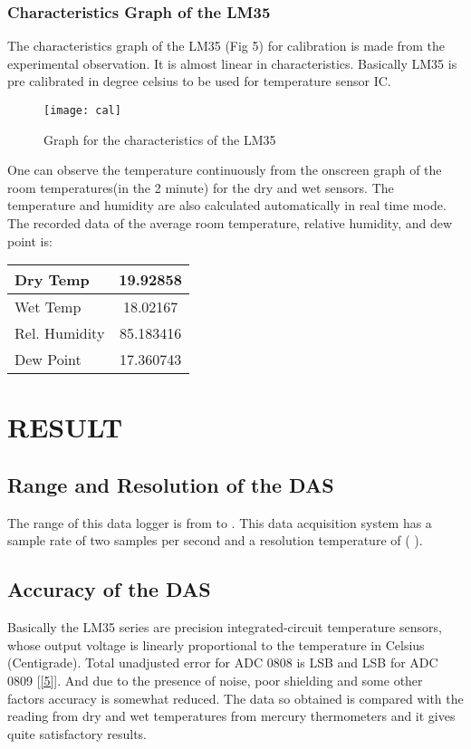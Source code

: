 \documentclass[10pt,a4paper]{article}
\begin{document}
\subsubsection{Characteristics Graph of the LM35}
The characteristics graph of the LM35 (Fig 5) for calibration is made from the experimental observation. It is almost linear in characteristics. Basically LM35 is pre calibrated in degree celsius to be used for temperature sensor IC.
\begin{figure}[!h]
\centering \texttt{[image: cal]}
\caption{Graph for the characteristics of the LM35}
\end{figure}

One can observe the temperature continuously from the onscreen graph of the room temperatures(in the 2 minute) for the dry and wet sensors. The temperature and humidity are also calculated automatically in real time mode.\\

The recorded data of the average room temperature, relative humidity, and dew point is:\\
\begin{table}[!h]
\centering \begin{tabular}{|l|c|}
\hline
Dry Temp & 19.92858\\
\hline
Wet Temp & 18.02167\\
\hline
Rel. Humidity & 85.183416\\
\hline
Dew Point & 17.360743\\
\hline
\end{tabular}
\end{table}
\section{RESULT}
\subsection{Range and Resolution of the DAS}
The range of this data logger is from  to . This data acquisition system has a sample rate of two samples per second and a resolution temperature of  ( ).
\subsection{Accuracy of the DAS}
Basically the LM35 series are precision integrated-circuit temperature sensors, whose output voltage is linearly proportional to the temperature in Celsius (Centigrade). Total unadjusted error for ADC 0808 is  LSB and  LSB for ADC 0809 [\ref{5}]. And due to the presence of noise, poor shielding and some other factors accuracy is somewhat reduced. The data so obtained is compared with the reading from dry and wet temperatures from mercury thermometers and it gives quite satisfactory results.
\end{document}
